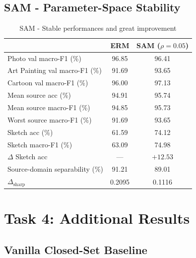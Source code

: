 \documentclass{article}
\begin{document}
\subsection{SAM - Parameter-Space Stability}

\begin{table}[H]
  \caption{SAM - Stable performances and great improvement}
  \label{tab:sam}
  \centering
  \begin{tabular}{lcc}
    \toprule
    & ERM & SAM ($\rho=0.05$) \\
    \midrule
    Photo val macro-F1 (\%)        & 96.85 & 96.41 \\
    Art Painting val macro-F1 (\%) & 91.69 & 93.65 \\
    Cartoon val macro-F1 (\%)      & 96.00 & 97.13 \\
    \midrule
    Mean source acc (\%)           & 94.91 & 95.74 \\
    Mean source macro-F1 (\%)      & 94.85 & 95.73 \\
    Worst source macro-F1 (\%)     & 91.69 & 93.65 \\
    \midrule
    Sketch acc (\%)                & 61.59 & 74.12 \\
    Sketch macro-F1 (\%)           & 63.09 & 74.98 \\
    $\Delta$ Sketch acc            & ---   & $+12.53$ \\
    \midrule
    Source-domain separability (\%) & 91.21 & 89.01 \\
    $\Delta_{\mathrm{sharp}}$       & 0.2095 & 0.1116 \\
    \bottomrule
  \end{tabular}
\end{table}

\section{Task 4: Additional Results}

\subsection{Vanilla Closed-Set Baseline}
\end{document}
